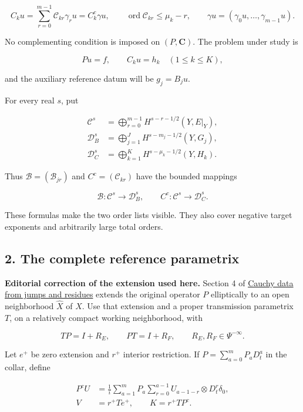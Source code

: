 \documentclass[
  11pt,
]{article}
\begin{document}
\[
 C_k u=\sum_{r=0}^{m-1}\mathcal C_{kr}\gamma_r u
       =C_k^c\gamma u,
 \qquad
 \operatorname{ord}\mathcal C_{kr}\leq\mu_k-r,
 \qquad
 \gamma u=(\gamma_0u,\ldots,\gamma_{m-1}u).
 \tag{BDR3}
\]

No complementing condition is imposed on \((P,\mathbf C)\). The problem
under study is

\[
 Pu=f,\qquad C_ku=h_k\quad(1\leq k\leq K),
 \tag{BDR4}
\]

and the auxiliary reference datum will be \(g_j=B_ju\).

For every real \(s\), put

\[
 \begin{aligned}
 \mathcal C^s
   &=\bigoplus_{r=0}^{m-1}H^{s-r-1/2}(Y,E|_Y),\\
 \mathcal D_B^s
   &=\bigoplus_{j=1}^{J}H^{s-m_j-1/2}(Y,G_j),\\
 \mathcal D_C^s
   &=\bigoplus_{k=1}^{K}H^{s-\mu_k-1/2}(Y,H_k).
 \end{aligned}
 \tag{BDR5}
\]

Thus \(\mathcal B=(\mathcal B_{jr})\) and \(C^c=(\mathcal C_{kr})\) have
the bounded mappings

\[
 \mathcal B:\mathcal C^s\longrightarrow\mathcal D_B^s,
 \qquad
 C^c:\mathcal C^s\longrightarrow\mathcal D_C^s.
 \tag{BDR6}
\]

These formulas make the two order lists visible. They also cover
negative target exponents and arbitrarily large total orders.

\subsection{2. The complete reference
parametrix}\label{the-complete-reference-parametrix}

\textbf{Editorial correction of the extension used here.} Section 4 of
\href{calderon-cauchy-data.pdf}{Cauchy data from jumps and residues}
extends the original operator \(P\) elliptically to an open neighborhood
\(\widehat X\) of \(X\). Use that extension and a proper transmission
parametrix \(T\), on a relatively compact working neighborhood, with

\[
 TP=I+R_E,\qquad PT=I+R_F,
 \qquad R_E,R_F\in\Psi^{-\infty}.
 \tag{BDR7}
\]

Let \(e^+\) be zero extension and \(r^+\) interior restriction. If
\(P=\sum_{a=0}^mP_aD_t^a\) in the collar, define

\[
 \begin{aligned}
 P^cU
 &=\frac1i\sum_{a=1}^mP_a
       \sum_{r=0}^{a-1}U_{a-1-r}\otimes D_t^r\delta_0,\\
 V&=r^+Te^+,
 \qquad K=r^+TP^c.
 \end{aligned}
 \tag{BDR8}
\]
\end{document}
